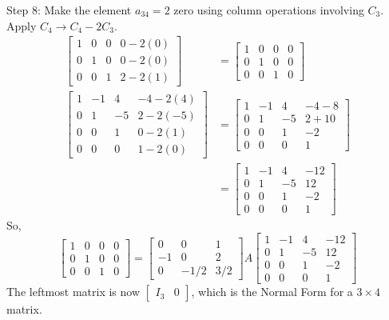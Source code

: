\documentclass{article}
\begin{document}
Step 8: Make the element $a_{34}=2$ zero using column operations involving $C_3$.
Apply $C_4 \to C_4 - 2C_3$.
\begin{align*} \begin{bmatrix} 1 & 0 & 0 & 0 - 2(0) \\ 0 & 1 & 0 & 0 - 2(0) \\ 0 & 0 & 1 & 2 - 2(1) \end{bmatrix} &= \begin{bmatrix} 1 & 0 & 0 & 0 \\ 0 & 1 & 0 & 0 \\ 0 & 0 & 1 & 0 \end{bmatrix} \\ \begin{bmatrix} 1 & -1 & 4 & -4 - 2(4) \\ 0 & 1 & -5 & 2 - 2(-5) \\ 0 & 0 & 1 & 0 - 2(1) \\ 0 & 0 & 0 & 1 - 2(0) \end{bmatrix} &= \begin{bmatrix} 1 & -1 & 4 & -4 - 8 \\ 0 & 1 & -5 & 2 + 10 \\ 0 & 0 & 1 & -2 \\ 0 & 0 & 0 & 1 \end{bmatrix} \\ &= \begin{bmatrix} 1 & -1 & 4 & -12 \\ 0 & 1 & -5 & 12 \\ 0 & 0 & 1 & -2 \\ 0 & 0 & 0 & 1 \end{bmatrix}\end{align*}
So,
\[ \begin{bmatrix} 1 & 0 & 0 & 0 \\ 0 & 1 & 0 & 0 \\ 0 & 0 & 1 & 0 \end{bmatrix} = \begin{bmatrix} 0 & 0 & 1 \\ -1 & 0 & 2 \\ 0 & -1/2 & 3/2 \end{bmatrix} A \begin{bmatrix} 1 & -1 & 4 & -12 \\ 0 & 1 & -5 & 12 \\ 0 & 0 & 1 & -2 \\ 0 & 0 & 0 & 1 \end{bmatrix} \]
The leftmost matrix is now $\begin{bmatrix} I_3 & 0 \end{bmatrix}$, which is the Normal Form for a $3 \times 4$ matrix.
\end{document}

